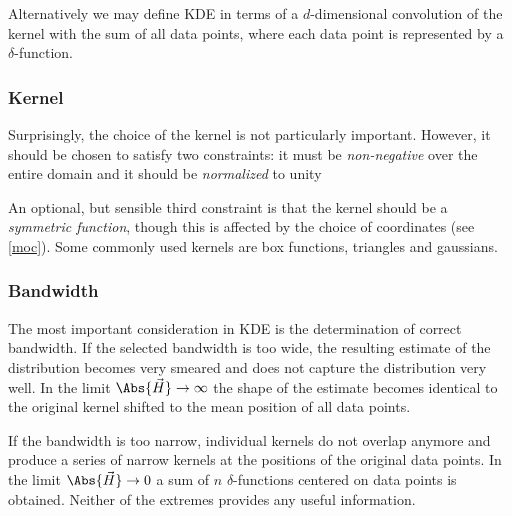         Alternatively we may define KDE in terms of a $d$-dimensional convolution of the kernel with the sum of all data points,
        where each data point is represented by a $\delta$-function.

        \subsubsection{Kernel} \label{mmkk}
            Surprisingly, the choice of the kernel is not particularly important.
            However, it should be chosen to satisfy two constraints: it must be
            \emph{non-negative} over the entire domain
            and it should be \emph{normalized} to unity

            An optional, but sensible third constraint is that the kernel should be a \emph{symmetric function},
            though this is affected by the choice of coordinates (see \cref{moc}).
            Some commonly used kernels are box functions, triangles and gaussians.

        \subsubsection{Bandwidth} \label{mmkw}
            The most important consideration in KDE is the determination of correct bandwidth.
            If the selected bandwidth is too wide, the resulting estimate of the distribution
            becomes very smeared and does not capture the distribution very well.
            In the limit $\Abs{\vec{H}} \to \infty$ the shape of the estimate becomes identical to the original kernel
            shifted to the mean position of all data points.

            If the bandwidth is too narrow, individual kernels do not overlap anymore and produce a series
            of narrow kernels at the positions of the original data points. In the limit $\Abs{\vec{H}} \to 0$
            a sum of $n$ $\delta$-functions centered on data points is obtained.
            Neither of the extremes provides any useful information.

